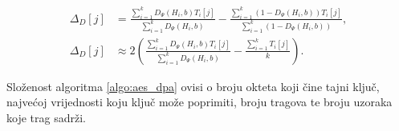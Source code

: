 \documentclass[times, utf8, numeric, diplomski]{fer}
\begin{document}
\begin{align}
\Delta_{D}\left[j\right] &= \frac{\sum_{i=1}^{k}D_{\Psi}\left(H_i,b\right)T_i\left[j\right]}{\sum_{i=1}^{k}D_{\Psi}\left(H_i,b\right)} - 
\frac{\sum_{i=1}^{k}\left(1-D_{\Psi}\left(H_i,b\right)\right)T_i\left[j\right]}{\sum_{i=1}^{k}\left(1-D_{\Psi}\left(H_i,b\right)\right)}, \label{eq:dpaex1}\\
\Delta_{D}\left[j\right] &\approx 2 \left( \frac{\sum_{i=1}^{k}D_{\Psi}\left(H_i,b\right)T_i\left[j\right]}{\sum_{i=1}^{k}D_{\Psi}\left(H_i,b\right)} - \frac{\sum_{i=1}^{k}T_i\left[j\right]}{k}  \right).\label{eq:dpaex2}
\end{align}

\noindent Složenost algoritma \ref{algo:aes_dpa} ovisi o broju okteta koji čine tajni ključ, najvećoj vrijednosti koju ključ može poprimiti, broju tragova te broju uzoraka koje trag sadrži.

\iffalse
\end{document}
